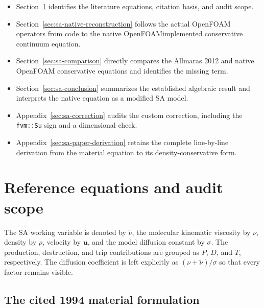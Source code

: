 \documentclass[11pt]{article}
\newcommand{\SAcode}[1]{\texttt{#1}}
\newcommand{\SAOF}{OpenFOAM}
\begin{document}
\begin{itemize}
  \item Section~\ref{sec:sa-reference} identifies the literature equations,
    citation basis, and audit scope.
  \item Section~\ref{sec:sa-native-reconstruction} follows the actual
    \SAOF{} operators from code to the native \SAOF implemented conservative continuum equation.
  \item Section~\ref{sec:sa-comparison} directly compares the Allmaras 2012
    and native \SAOF{} conservative equations and identifies the missing term.
  \item Section~\ref{sec:sa-conclusion} summarizes the established algebraic
    result and interprets the native equation as a modified SA model.
  \item Appendix~\ref{sec:sa-correction} audits the custom correction,
    including the \SAcode{fvm::Su} sign and a dimensional check.
  \item Appendix~\ref{sec:sa-paper-derivation} retains the complete
    line-by-line derivation from the material equation to its
    density-conservative form.
\end{itemize}

\section{Reference equations and audit scope}
\label{sec:sa-reference}

The SA working variable is denoted by \(\widetilde{\nu}\), the molecular
kinematic viscosity by \(\nu\), density by \(\rho\), velocity by
\(\boldsymbol u\), and the model diffusion constant by \(\sigma\).  The
production, destruction, and trip contributions are grouped as \(P\), \(D\),
and \(T\), respectively.  The diffusion coefficient is left explicitly as
\((\nu+\widetilde{\nu})/\sigma\) so that every factor remains visible.

\subsection{The cited 1994 material formulation}
\end{document}
